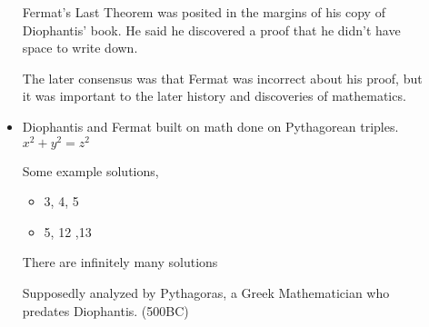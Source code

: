 \documentclass{report}
\begin{document}
\begin{description}
\begin{itemize}
\begin{mdframed}
                    Fermat's Last Theorem was posited in the margins
                    of his copy of Diophantis' book. He said he discovered
                    a proof that he didn't have space to write down.
                \end{mdframed}
                \begin{mdframed}
                    The later consensus was that Fermat was
                    incorrect about his proof, but it was
                    important to the later history and discoveries
                    of mathematics.
                \end{mdframed}
            \item Diophantis and Fermat built on math done
                on Pythagorean triples. $x^2 + y^2 = z^2$
                 \begin{mdframed}
                    Some example solutions,
                    \begin{itemize}
                        \item 3, 4, 5
                        \item 5, 12 ,13
                    \end{itemize}
                    There are infinitely many solutions
                \end{mdframed}
                \begin{mdframed}
                    Supposedly analyzed by Pythagoras, a Greek
                    Mathematician who predates Diophantis. (500BC)


\end{mdframed}
\end{itemize}
\end{description}
\end{document}
